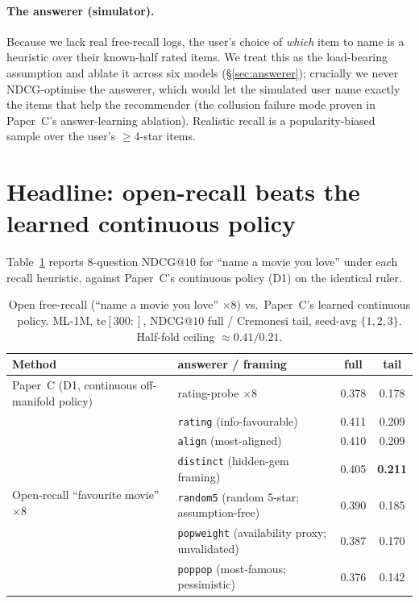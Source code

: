 \documentclass[11pt]{article}
\makeatletter
\newcommand{\ndcg}{\mathrm{NDCG@}10}
\makeatother
\begin{document}
\paragraph{The answerer (simulator).} Because we lack real free-recall logs, the user's choice of \emph{which} item to
name is a heuristic over their known-half rated items. We treat this as the load-bearing assumption and ablate it
across six models (\S\ref{sec:answerer}); crucially we never NDCG-optimise the answerer, which would let the simulated
user name exactly the items that help the recommender (the collusion failure mode proven in Paper~C's answer-learning
ablation). Realistic recall is a popularity-biased sample over the user's $\ge 4$-star items.

\section{Headline: open-recall beats the learned continuous policy}
\label{sec:headline}
Table~\ref{tab:headline} reports $8$-question $\ndcg$ for ``name a movie you love'' under each recall heuristic,
against Paper~C's continuous policy (D1) on the identical ruler.

\begin{table}[t]
\centering
\caption{Open free-recall (``name a movie you love'' $\times 8$) vs.\ Paper~C's learned continuous policy.
ML-1M, te$[300{:}]$, $\ndcg$ full / Cremonesi tail, seed-avg $\{1,2,3\}$. Half-fold ceiling $\approx 0.41/0.21$.}
\label{tab:headline}
\begin{tabular}{llcc}
\toprule
Method & answerer / framing & full & tail \\
\midrule
Paper~C (D1, continuous off-manifold policy) & rating-probe $\times 8$ & 0.378 & 0.178 \\
\midrule
\multirow{6}{*}{Open-recall ``favourite movie'' $\times 8$}
 & \texttt{rating} (info-favourable)        & 0.411 & 0.209 \\
 & \texttt{align} (most-aligned)            & 0.410 & 0.209 \\
 & \texttt{distinct} (hidden-gem framing)   & 0.405 & \textbf{0.211} \\
 & \texttt{random5} (random 5-star; assumption-free) & 0.390 & 0.185 \\
 & \texttt{popweight} (availability proxy; unvalidated) & 0.387 & 0.170 \\
 & \texttt{poppop} (most-famous; pessimistic)& 0.376 & 0.142 \\
\bottomrule
\end{tabular}
\end{table}
\end{document}
